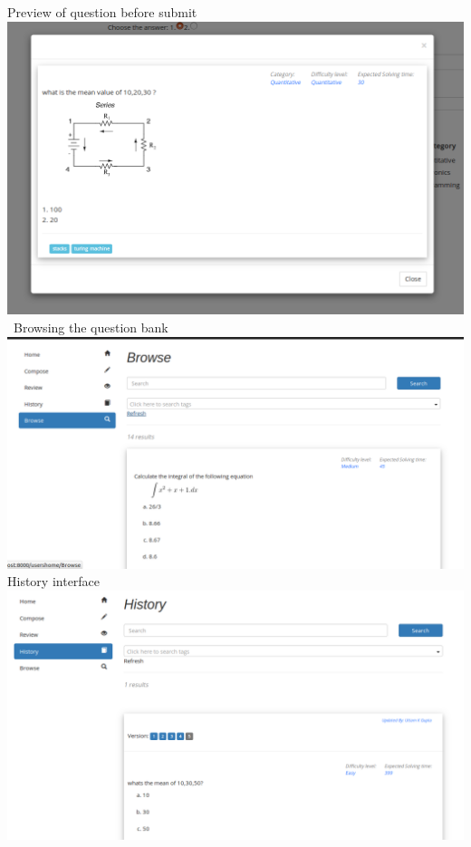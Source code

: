 \documentclass[a4paper,12pt,oneside]{book}
\begin{document}
\vspace{0.7in}
Preview of question before submit\\
\includegraphics[scale=0.37]{preview.png}	\\

\
Browsing the question bank\\
\includegraphics[scale=0.3]{browse.png}	\\

History interface\\
\includegraphics[scale=0.3]{history.png}	\\
\end{document}

